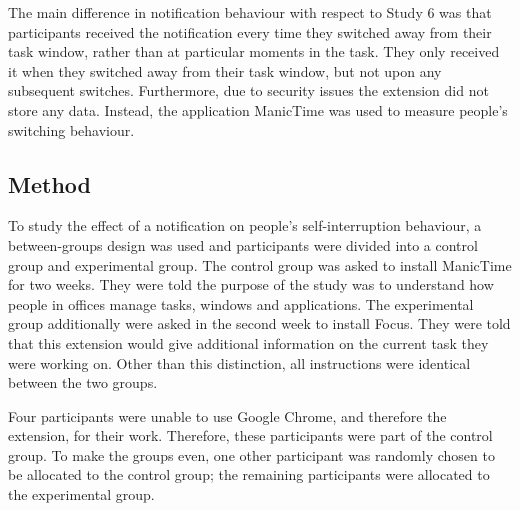 The main difference in notification behaviour with respect to Study 6 was that participants received the notification every time they switched away from their task window, rather than at particular moments in the task. They only received it when they switched away from their task window, but not upon any subsequent switches. Furthermore, due to security issues the extension did not store any data. Instead, the application ManicTime was used to measure people's switching behaviour. 


\subsection{Method}
To study the effect of a notification on people's self-interruption behaviour, a between-groups design was used and participants were divided into a control group and experimental group. The control group was asked to install ManicTime for two weeks. They were told the purpose of the study was to understand how people in offices manage tasks, windows and applications. The experimental group additionally were asked in the second week to install Focus. They were told that this extension would give additional information on the current task they were working on. Other than this distinction, all instructions were identical between the two groups. 

Four participants were unable to use Google Chrome, and therefore the extension, for their work. Therefore, these participants were part of the control group. To make the groups even, one other participant was randomly chosen to be allocated to the control group; the remaining participants were allocated to the experimental group. 


